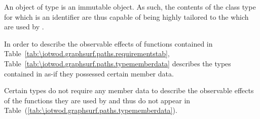 \pnum
\begin{note}
An object of type  is an immutable object. As such, the contents of the class type for which  is an identifier are thus capable of being highly tailored to the \underlyingrendandpresenttechs which are used by .
\end{note}

\pnum
In order to describe the observable effects of functions contained in Table~\ref{tab:\iotwod.graphsurf.paths.requirementstab}, Table~\ref{tab:\iotwod.graphsurf.paths.typememberdata} describes the types contained in  as-if they possessed certain member data. 

\pnum
\begin{note}
Certain types do not require any member data to describe the observable effects of the functions they are used by and thus do not appear in Table~(\ref{tab:\iotwod.graphsurf.paths.typememberdata}).
\end{note}

